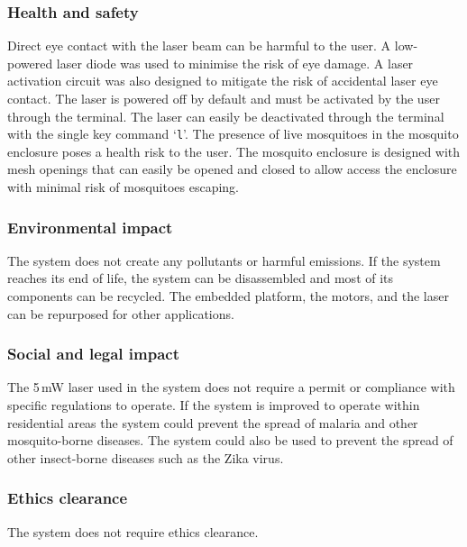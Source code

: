 \subsubsection{Health and safety}
Direct eye contact with the laser beam can be harmful to the user. A low-powered laser diode was used to minimise the risk of eye damage. A laser activation circuit was also designed to mitigate the risk of accidental laser eye contact. The laser is powered off by default and must be activated by the user through the terminal. The laser can easily be deactivated through the terminal with the single key command `\texttt{l}'. The presence of live mosquitoes in the mosquito enclosure poses a health risk to the user. The mosquito enclosure is designed with mesh openings that can easily be opened and closed to allow access the enclosure with minimal risk of mosquitoes escaping.

\subsubsection{Environmental impact}
The system does not create any pollutants or harmful emissions. If the system reaches its end of life, the system can be disassembled and most of its components can be recycled. The embedded platform, the motors, and the laser can be repurposed for other applications.

\subsubsection{Social and legal impact}
The 5\,mW laser used in the system does not require a permit or compliance with specific regulations to operate. If the system is improved to operate within residential areas the system could prevent the spread of malaria and other mosquito-borne diseases. The system could also be used to prevent the spread of other insect-borne diseases such as the Zika virus.

\subsubsection{Ethics clearance}
The system does not require ethics clearance.

\newpage



